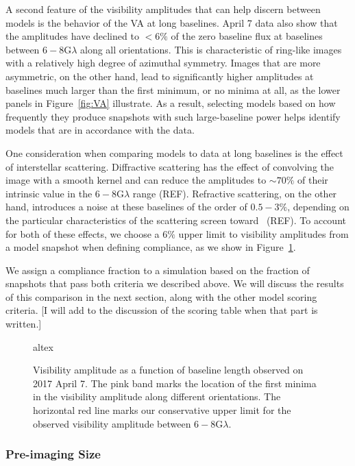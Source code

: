 A second feature of the visibility amplitudes that can help discern
between models is the behavior of the VA at long baselines.
April 7 data also show that the amplitudes have declined to $<6\%$ of
the zero baseline flux at baselines between $6-8$\;G$\lambda$ along
all orientations.
This is characteristic of ring-like images with a relatively high
degree of azimuthal symmetry. Images that are more asymmetric, on the
other hand, lead to significantly higher amplitudes at baselines much
larger than the first minimum, or no minima at all, as the lower
panels in Figure~\ref{fig:VA} illustrate. As a result, selecting
models based on how frequently they produce snapshots with such
large-baseline power helps identify models that are in accordance with
the data.

One consideration when comparing models to data at long baselines is
the effect of interstellar scattering. Diffractive scattering has the
effect of convolving the image with a smooth kernel and can reduce the
amplitudes to $\sim 70\%$ of their intrinsic value in the
$6-8$\;G$\lambda$ range (REF).
Refractive scattering, on the other hand, introduces a noise at these
baselines of the order of $0.5-3\%$, depending on the particular
characteristics of the scattering screen toward \sgra\ (REF). To
account for both of these effects, we choose a $6\%$ upper limit to
visibility amplitudes from a model snapshot when defining compliance,
as we show in Figure~\ref{fig:data_comp}.

We assign a compliance fraction to a simulation based on the fraction
of snapshots that pass both criteria we described above. We will
discuss the results of this comparison in the next section, along with
the other model scoring criteria. [I will add to the discussion of the
  scoring table when that part is written.]

\begin{figure}
  altex
  \caption{Visibility amplitude as a function of baseline length
    observed on 2017 April 7. The pink band marks the location of the
    first minima in the visibility amplitude along different
    orientations. The horizontal red line marks our conservative upper
    limit for the observed visibility amplitude between $6-8$G$\lambda$.}
\label{fig:data_comp}
\end{figure}

\subsubsection{Pre-imaging Size}

